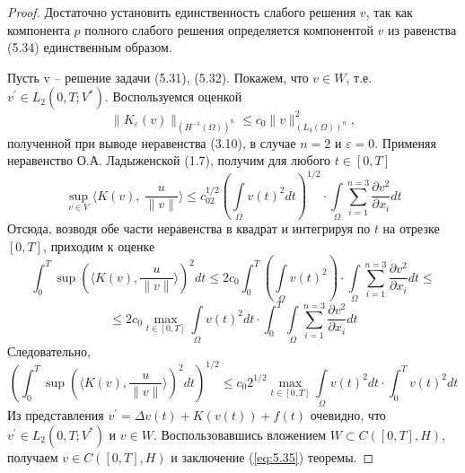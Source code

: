 \begin{proof}
    Достаточно установить единственность слабого решения $v$, так как компонента $p$ полного слабого решения определяется компонентой $v$
    из равенства (5.34) единственным образом.

    Пусть v -- решение задачи (5.31), (5.32). Покажем, что $v \in W$, т.е. $v^\prime \in L_2(0, T; V^\ast)$.
    Воспользуемся оценкой
    $$\| K_\varepsilon (v) \|_{(H^{-1}(\Omega))^n} \le c_0 \| v \|^2_{(L_4(\Omega))^n},$$
    полученной при выводе неравенства (3.10), в случае $n = 2$ и $\varepsilon = 0$. Применяя неравенство О.А. Ладыженской (1.7), получим для любого $t \in [0, T]$
    $$\sup\limits_{v\in V}\langle K(v), \ \frac{u}{\| v\|}
    \rangle\le c_02^{1/2}(\int\limits_\Omega v(t)^2dt)^{1/2}\cdot\int\limits_\Omega\sum_{i=1}^{n=3}\frac{\partial v^2}{\partial x_i}dt$$
    Отсюда, возводя обе части неравенства в квадрат и интегрируя по $t$ на отрезке $[0, T]$, приходим к оценке
    $$\int_0^T \sup(\langle K(v), \frac{u}{\| v\|}\rangle)^2dt \le 2c_0\int_0^T(\int\limits_\Omega v(t)^2)
    \cdot\int\limits_\Omega\sum_{i=1}^{n=3}\frac{\partial v^2}{\partial x_i}dt\le$$
    $$\le 2c_0 \max\limits_{t\in[0, T]}\int\limits_\Omega v(t)^2dt\cdot\int_0^T\int\limits_\Omega\sum_{i=1}^{n=3}\frac{\partial v^2}{\partial x_i}dt$$
    Следовательно,
    $$(\int_0^T \sup(\langle K(v), \frac{u}{\| v\|}\rangle)^2dt)^{1/2}\le c_0 2^{1/2}\max\limits_{t\in[0, T]}
    \int\limits_\Omega v(t)^2dt\cdot\int_0^T v(t)^2dt$$
    Из представления $v^\prime = \Delta v(t) + K(v(t)) + f(t)$ очевидно, что $v^\prime \in L_2(0, T; V^\ast)$ и $v \in W$.
    Воспользовавшись вложением $W \subset C([0, T], H)$, получаем $v \in C([0, T], H)$ и заключение (\ref{eq:5.35}) теоремы.


\end{proof}
